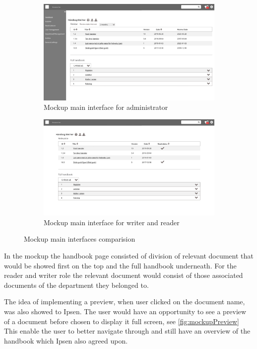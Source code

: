 \documentclass[../../master.tex]{subfiles}
\begin{document}
\begin{figure}[H]
	\centering
	\begin{subfigure}[b]{0.48\textwidth}
		\includegraphics[width=\textwidth]{billeder/ForsideAdmin.jpg}
		\caption{Mockup main interface for administrator}
	\end{subfigure}
	\quad
	\begin{subfigure}[b]{0.48\textwidth}
		\includegraphics[width=\textwidth]{billeder/ForsideWriterReader.jpg}
		\caption{Mockup main interface for writer and reader}
	\end{subfigure}
	\caption{Mockup main interfaces comparision}\label{fig:mockupSidebar}
\end{figure}

In the mockup the handbook page consisted of division of relevant document that would be showed first on the top and the full handbook underneath.
For the reader and writer role the relevant document would consist of those associated documents of the department they belonged to.

The idea of implementing a preview, when user clicked on the document name, was also showed to Ipsen.
The user would have an opportunity to see a preview of a document before chosen to display it full screen, see \cref{fig:mockupPreview}
This enable the user to better navigate through and still have an overview of the handbook which Ipsen also agreed upon.
\end{document}
